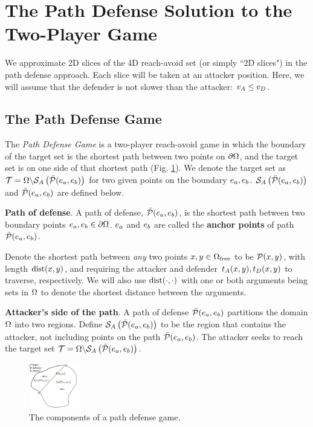 \section{The Path Defense Solution to the Two-Player Game}
\label{sec:path_defense}
We approximate 2D slices of the 4D reach-avoid set (or simply ``2D slices") in the path defense approach. Each slice will be taken at an attacker position. Here, we will assume that the defender is not slower than the attacker: $v_A \leq v_D$. 

\subsection{The Path Defense Game}
\label{subsec:pd_game}
The \textit{Path Defense Game} is a two-player reach-avoid game in which the boundary of the target set is the shortest path between two points on $\partial\Omega$, and the target set is on one side of that shortest path (Fig. \ref{fig:pd_form}). We denote the target set as $\mathcal{T}=\Omega\backslash\mathcal{S}_A\left(\bar{\mathcal{P}}(e_a,e_b)\right)$ for two given points on the boundary $e_a,e_b$. $\mathcal{S}_A\left(\bar{\mathcal{P}}(e_a,e_b)\right)$ and $\bar{\mathcal{P}}(e_a,e_b)$ are defined below. 

\begin{defn} %
\textbf{Path of defense}. A path of defense, $\bar{\mathcal{P}}(e_a,e_b)$, is the shortest path between two boundary points $e_a,e_b\in\partial\Omega$. $e_a$ and $e_b$ are called the \textbf{anchor points} of path $\bar{\mathcal{P}}(e_a,e_b)$. 
\end{defn}

Denote the shortest path between \textit{any} two points $x,y\in\Omega_{\text{free}}$ to be $\mathcal{P}(x,y)$, with length $\text{dist}(x,y)$, and requiring the attacker and defender $t_A(x, y),t_D(x,y)$ to traverse, respectively. We will also use $\text{dist}(\cdot,\cdot)$ with one or both arguments being sets in $\Omega$ to denote the shortest distance between the arguments.

\begin{defn} %
\textbf{Attacker's side of the path}. A path of defense $\bar{\mathcal{P}}(e_a,e_b)$ partitions the domain $\Omega$ into two regions. Define $\mathcal{S}_A\left(\bar{\mathcal{P}}(e_a,e_b)\right)$ to be the region that contains the attacker, not including points on the path $\bar{\mathcal{P}}(e_a,e_b)$. The attacker seeks to reach the target set $\mathcal{T}=\Omega\backslash\mathcal{S}_A\left(\bar{\mathcal{P}}(e_a,e_b)\right)$.
\end{defn}

\begin{figure}
\centering
\includegraphics[width=0.2\textwidth]{"fig/path defense game"}
\caption{The components of a path defense game.}
\label{fig:pd_form}
\end{figure}

